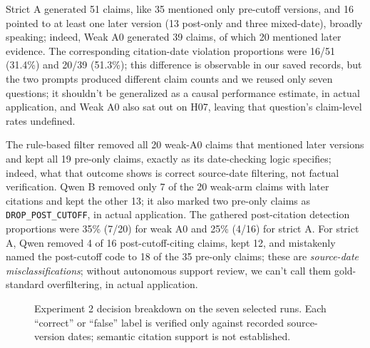 \documentclass[12pt,a4paper]{article}
\begin{document}
Strict A generated 51 claims, like 35 mentioned only pre-cutoff versions, and 16 pointed to at least one later version (13 post-only and three mixed-date), broadly speaking; indeed, Weak A0 generated 39 claims, of which 20 mentioned later evidence. The corresponding citation-date violation proportions were 16/51 (31.4\%) and 20/39 (51.3\%); this difference is observable in our saved records, but the two prompts produced different claim counts and we reused only seven questions; it shouldn't be generalized as a causal performance estimate, in actual application, and Weak A0 also sat out on H07, leaving that question's claim-level rates undefined.

The rule-based filter removed all 20 weak-A0 claims that mentioned later versions and kept all 19 pre-only claims, exactly as its date-checking logic specifies; indeed, what that outcome shows is correct source-date filtering, not factual verification. Qwen B removed only 7 of the 20 weak-arm claims with later citations and kept the other 13; it also marked two pre-only claims as \texttt{DROP\_POST\_CUTOFF}, in actual application. The gathered post-citation detection proportions were 35\% (7/20) for weak A0 and 25\% (4/16) for strict A. For strict A, Qwen removed 4 of 16 post-cutoff-citing claims, kept 12, and mistakenly named the post-cutoff code to 18 of the 35 pre-only claims; these are \emph{source-date misclassifications}; without autonomous support review, we can't call them gold-standard overfiltering, in actual application.

\begin{figure}[ht]
\centering
{}
\caption{Experiment 2 decision breakdown on the seven selected runs. Each ``correct'' or ``false'' label is verified only against recorded source-version dates; semantic citation support is not established.}
\label{fig:e2_decisions}
\end{figure}
\end{document}
